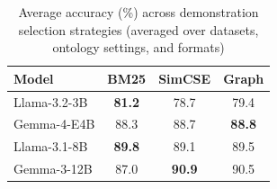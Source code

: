 \begin{table}[htbp]
\centering
\caption{Average accuracy (\%) across demonstration selection strategies (averaged over datasets, ontology settings, and formats)}
\label{tab:acc_avg_comparison}
\begin{tabular}{lccc}
\toprule
Model & BM25 & SimCSE & Graph \\
\midrule
Llama-3.2-3B         & \textbf{81.2} & 78.7 & 79.4 \\
Gemma-4-E4B          & 88.3 & 88.7 & \textbf{88.8} \\
Llama-3.1-8B         & \textbf{89.8} & 89.1 & 89.5 \\
Gemma-3-12B          & 87.0 & \textbf{90.9} & 90.5 \\
\bottomrule
\end{tabular}
\end{table}
